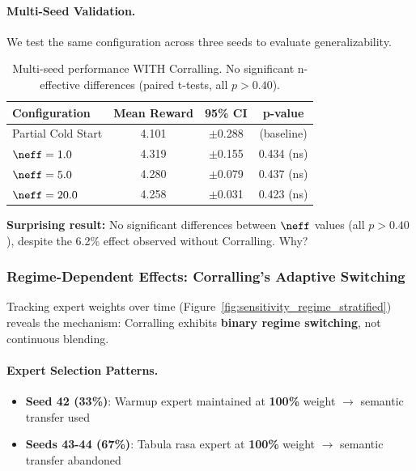 \paragraph{Multi-Seed Validation.}
We test the same configuration across three seeds to evaluate generalizability.

\begin{table}[h]
\centering
\small
\begin{tabular}{lccc}
\toprule
\textbf{Configuration} & \textbf{Mean Reward} & \textbf{95\% CI} & \textbf{p-value} \\
\midrule
Partial Cold Start & 4.101 & $\pm$0.288 & (baseline) \\
\midrule
$\neff = 1.0$ & 4.319 & $\pm$0.155 & 0.434 (ns) \\
$\neff = 5.0$ & 4.280 & $\pm$0.079 & 0.437 (ns) \\
$\neff = 20.0$ & 4.258 & $\pm$0.031 & 0.423 (ns) \\
\bottomrule
\end{tabular}
\caption{Multi-seed performance WITH Corralling. No significant n-effective differences (paired t-tests, all $p>0.40$).}
\label{tab:multiseed_corralling}
\end{table}

\textbf{Surprising result:} No significant differences between $\neff$ values (all $p > 0.40$), despite the 6.2\% effect observed without Corralling. Why?


\subsubsection{Regime-Dependent Effects: Corralling's Adaptive Switching}

Tracking expert weights over time (Figure~\ref{fig:sensitivity_regime_stratified}) reveals the mechanism: Corralling exhibits \textbf{binary regime switching}, not continuous blending.

\paragraph{Expert Selection Patterns.}
\begin{itemize}[leftmargin=*, itemsep=2pt]
    \item \textbf{Seed 42 (33\%)}: Warmup expert maintained at \textbf{100\%} weight $\to$ semantic transfer used
    \item \textbf{Seeds 43-44 (67\%)}: Tabula rasa expert at \textbf{100\%} weight $\to$ semantic transfer abandoned
\end{itemize}

